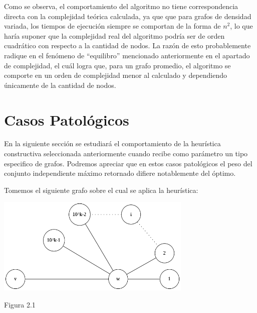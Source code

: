 \documentclass[a4paper,11pt] {article}
\begin{document}
Como se observa, el comportamiento del algoritmo no tiene correspondencia directa con la complejidad teórica calculada, ya que que para grafos de densidad variada, los tiempos de ejecución siempre se comportan de la forma de $n^2$, lo que haría suponer que la complejidad real del algoritmo podría ser de orden cuadrático con respecto a la cantidad de nodos. La razón de esto probablemente radique en el fenómeno de ``equilibro'' mencionado anteriormente en el apartado de complejidad, el cuál logra que, para un grafo promedio, el algoritmo se comporte en un orden de complejidad menor al calculado y dependiendo únicamente de la cantidad de nodos.

\section*{Casos Patol\'ogicos}

En la siguiente secci\'on se estudiar\'a el comportamiento de la heur\'istica constructiva seleccionada anteriormente cuando recibe como par\'ametro un tipo especifico de grafos. Podremos apreciar que en estos casos patol\'ogicos el peso del conjunto independiente m\'aximo retornado difiere notablemente del \'optimo.

Tomemos el siguiente grafo sobre el cual se aplica la heur\'istica:

\begin{center}
\includegraphics[width=0.7\textwidth]{graficos/casoMaloHC.png}
\begin{center}
Figura 2.1
\end{center}
\end{center}
\end{document}
